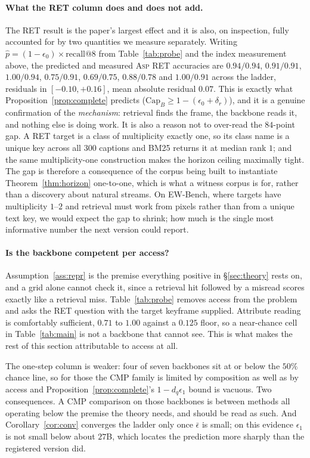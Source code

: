 \documentclass[10pt]{article}
\newcommand{\VN}{300}
\theoremstyle{definition}
\theoremstyle{plain}
\newcommand{\ASP}{\textsc{Asp}}
\renewcommand{\Cap}{\mathrm{Cap}}
\begin{document}
\paragraph{What the RET column does and does not add.} The RET result is the paper's largest
effect and it is also, on inspection, fully accounted for by two quantities we measure
separately. Writing $\hat p=(1-\epsilon_0)\times\text{recall}@8$ from Table~\ref{tab:probe} and
the index measurement above, the predicted and measured \ASP{} RET accuracies are
$0.94/0.94$, $0.91/0.91$, $1.00/0.94$, $0.75/0.91$, $0.69/0.75$, $0.88/0.78$ and $1.00/0.91$
across the ladder, residuals in $[-0.10,+0.16]$, mean absolute residual $0.07$. This is
exactly what Proposition~\ref{prop:complete} predicts ($\Cap_B\ge1-(\epsilon_0+\delta_r)$), and
it is a genuine confirmation of the \emph{mechanism}: retrieval finds the frame, the backbone
reads it, and nothing else is doing work. It is also a reason not to over-read the $84$-point
gap. A RET target is a class of multiplicity exactly one, so its class name is a unique key
across all $\VN{}$ captions and BM25 returns it at median rank $1$; and the same multiplicity-one
construction makes the horizon ceiling maximally tight. The gap is therefore a consequence of
the corpus being built to instantiate Theorem~\ref{thm:horizon} one-to-one, which is what a
witness corpus is for, rather than a discovery about natural streams. On EW-Bench, where targets
have multiplicity $1$--$2$ and retrieval must work from pixels rather than from a unique text
key, we would expect the gap to shrink; how much is the single most informative number the next
version could report.

\paragraph{Is the backbone competent per access?} Assumption~\ref{ass:repr} is the premise
everything positive in \S\ref{sec:theory} rests on, and a grid alone cannot check it, since a
retrieval hit followed by a misread scores exactly like a retrieval miss.
Table~\ref{tab:probe} removes access from the problem and asks the RET question with the target
keyframe supplied. Attribute reading is comfortably sufficient, $0.71$ to $1.00$ against a
$0.125$ floor, so a near-chance cell in Table~\ref{tab:main} is not a backbone that cannot see.
This is what makes the rest of this section attributable to access at all.

The one-step column is weaker: four of seven backbones sit at or below the $50\%$ chance line,
so for those the CMP family is limited by composition as well as by access and
Proposition~\ref{prop:complete}'s $1-d_q\epsilon_1$ bound is vacuous. Two consequences. A CMP
comparison on those backbones is between methods all operating below the premise the theory
needs, and should be read as such. And Corollary~\ref{cor:conv} converges the ladder only once
$\bar\epsilon$ is small; on this evidence $\epsilon_1$ is not small below about $27$B, which
locates the prediction more sharply than the registered version did.
\end{document}
